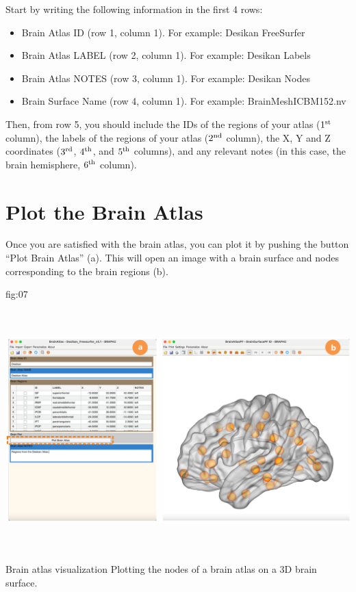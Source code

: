 \documentclass[justified]{tufte-handout}
\begin{document}
Start by writing the following information in the first 4 rows:
\begin{itemize}

\item Brain Atlas ID (row 1, column 1). 
For example: Desikan FreeSurfer

\item Brain Atlas LABEL (row 2, column 1). 
For example: Desikan Labels

\item Brain Atlas NOTES (row 3, column 1).
For example: Desikan Nodes

\item Brain Surface Name (row 4, column 1).
For example: BrainMeshICBM152.nv

\end{itemize}
Then, from row 5, you should include the IDs of the regions of your atlas ($1^{\rm st}$ column), the labels of the regions of your atlas ($2^{\rm nd}$ column), the X, Y and Z coordinates ($3^{\rm rd}$, $4^{\rm th}$, and $5^{\rm th}$ columns), and any relevant notes (in this case, the brain hemisphere, $6^{\rm th}$ column).	

\clearpage
\section{Plot the Brain Atlas}

Once you are satisfied with the brain atlas, you can plot it by pushing the button ``Plot Brain Atlas'' (a). 
This will open an image with a brain surface and nodes corresponding to the brain regions (b).

	{fig:07}
	{\includegraphics[height=10cm]{fig07.png}}
	{Brain atlas visualization}
	{
	Plotting the nodes of a brain atlas on a 3D brain surface. 
	}
	
\end{document}

